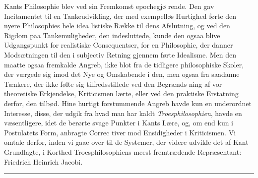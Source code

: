 \documentclass[12pt,a4paper]{book}
\newcommand{\divrule}{\begin{center}\rule{2cm}{0.4pt}\end{center}}
\begin{document}
Kants Philosophie blev ved sin Fremkomst epochegjø\-%
rende. Den gav Incitamentet til en Tankeudvikling, der med
exempelløs Hurtighed førte den nyere Philosophies hele idea\-%
listiske Række til dens Afslutning, og ved den Rigdom paa
Tankemuligheder, den indesluttede, kunde den ogsaa blive
Udgangspunkt for realistiske Consequentser, for en Philosophie,
der danner Modsætningen til den i subjectiv Retning gjennem\-%
førte Idealisme. Men den maatte ogsaa fremkalde Angreb,
ikke blot fra de tidligere philosophiske Skoler, der værgede sig
imod det Nye og Omskabende i den, men ogsaa fra saadanne
Tænkere, der ikke følte sig tilfredsstillede ved den Begrænds\-%
ning af vor theoretiske Erkjendelse, Kriticismen lærte, eller
ved den praktiske Erstatning derfor, den tilbød. Hine hurtigt
forstummende Angreb havde kun en underordnet Interesse,
disse, der udgik fra hvad man har kaldt \emph{Troesphilosophien},
havde en væsentligere, idet de berørte svage Punkter i Kants
Lære, og, om end kun i Postulatets Form, anbragte Correc\-%
tiver mod Ensidigheder i Kriticismen. Vi omtale derfor, inden
vi gaae over til de Systemer, der videre udvikle det af Kant
Grundlagte, i Korthed Troesphilosophiens meest fremtrædende
Repræsentant: Friedrich Heinrich Jacobi.

\divrule
\end{document}
